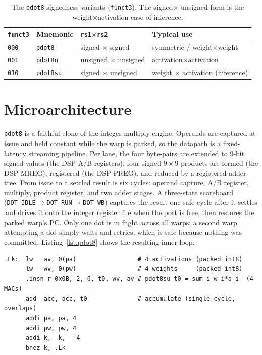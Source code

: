 \documentclass[12pt,a4paper,oneside]{report}
\newcommand{\code}[1]{\texttt{#1}}
\begin{document}
\begin{table}[t]
\caption{The \code{pdot8} signedness variants (\code{funct3}). The signed$\times$
unsigned form is the weight$\times$activation case of inference.}
\label{tab:pdot8}
\centering
\small
\begin{tabular}{llll}
\toprule
\code{funct3} & Mnemonic & \code{rs1}$\times$\code{rs2} & Typical use\\
\midrule
\code{000} & \code{pdot8}   & signed $\times$ signed   & symmetric / weight$\times$weight\\
\code{001} & \code{pdot8u}  & unsigned $\times$ unsigned & activation$\times$activation\\
\code{010} & \code{pdot8su} & signed $\times$ unsigned  & weight $\times$ activation (inference)\\
\bottomrule
\end{tabular}
\end{table}

\section{Microarchitecture}
\code{pdot8} is a faithful clone of the integer-multiply engine. Operands are
captured at issue and held constant while the warp is parked, so the datapath is a
fixed-latency streaming pipeline. Per lane, the four byte-pairs are extended to
9-bit signed values (the DSP A/B registers), four signed $9\times 9$ products are
formed (the DSP MREG), registered (the DSP PREG), and reduced by a registered
adder tree. From issue to a settled result is six cycles: operand capture, A/B
register, multiply, product register, and two adder stages. A three-state
scoreboard (\code{DOT\_IDLE}$\rightarrow$\code{DOT\_RUN}$\rightarrow$\code{DOT\_WB})
captures the result one safe cycle after it settles and drives it onto the integer
register file when the port is free, then restores the parked warp's PC. Only one
dot is in flight across all warps; a second warp attempting a dot simply waits and
retries, which is safe because nothing was committed. Listing~\ref{lst:pdot8}
shows the resulting inner loop.

\begin{lstlisting}[caption={INT8 dot-product inner loop: one \code{pdot8} per four
MACs, versus four multiplies and four adds plus byte extraction for a scalar
equivalent.},label={lst:pdot8}]
.Lk:  lw   av, 0(pa)                 # 4 activations (packed int8)
      lw   wv, 0(pw)                 # 4 weights     (packed int8)
      .insn r 0x0B, 2, 0, t0, wv, av # pdot8su t0 = sum_i w_i*a_i  (4 MACs)
      add  acc, acc, t0              # accumulate (single-cycle, overlaps)
      addi pa, pa, 4
      addi pw, pw, 4
      addi k,  k,  -4
      bnez k, .Lk
\end{lstlisting}
\end{document}
